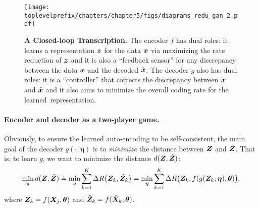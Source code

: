\documentclass[../../book-main.tex]{subfiles}
\begin{document}
\begin{figure}[t]
{\texttt{[image: \\toplevelprefix/chapters/chapter5/figs/diagrams\_redu\_gan\_2.pdf]}}
\caption{{\bf %
 A Closed-loop Transcription.} The encoder $f$ has dual roles: it learns a representation $\bm{z}$ for the data $\bm{x}$ via maximizing the rate reduction of $\bm{z}$ and it is also a ``feedback sensor'' for any discrepancy between the data $\bm{x}$ and the decoded $\hat {\bm{x}}$. The decoder $g$ also has dual roles: it is a ``controller'' that corrects the  discrepancy between $\bm{x}$ and $\hat {\bm{x}}$ and it also aims to minimize the overall coding rate for the learned~representation.} \label{fig:auto-encoding-closed} 
\end{figure}


\paragraph{Encoder and decoder as a two-player game.}
Obviously, to ensure the learned auto-encoding to be self-consistent,  the main goal of the decoder $g(\cdot, \bm \eta)$ is to {\em minimize} the distance between $\bm{Z}$ and $\hat {\bm{Z}}$. That is, to learn $g$, we want to minimize the distance $d(\bm{Z}, \hat {\bm{Z}})$:
\begin{equation}
\min_g d(\bm{Z}, \hat {\bm{Z}}) \doteq \min_\eta  \sum_{k=1}^K \Delta R\big(\bm{Z}_k, \hat{\bm{Z}}_k\big) =  \min_{\bm \eta}  \sum_{k=1}^K \Delta R\big(\bm{Z}_k, f(g(\bm{Z}_k, \bm \eta),\bm \theta)\big),
\label{eqn:min-distance}
\end{equation}
where $\bm{Z}_k = f(\bm{X}_j,\bm \theta)$ and $\hat {\bm{Z}}_k = f(\hat{\bm{X}}_k,\bm\theta)$. 
\end{document}

